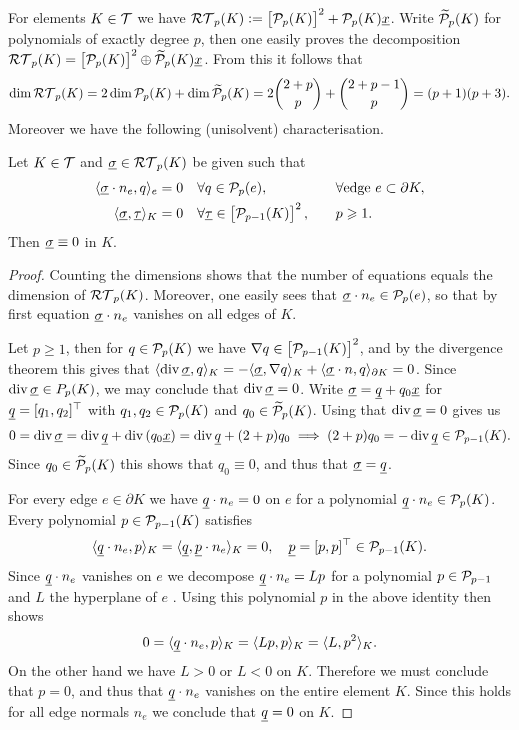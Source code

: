 \documentclass[thesis.tex]{subfiles}
\begin{document}
For elements $K \in  \T$ we have $\RT_p(K) := \left[ \P_p(K)\right]^2 + \P_p(K)\v{x}$.
Write $\wt \P_p(K)$ for polynomials of exactly degree $p$, then one easily proves the decomposition
$\RT_p(K) = \left [\P_p(K)\right]^2 \oplus \wt \P_p(K) \v{x}$.
From this it follows that 
\[
  \dim{\RT_p(K)} = 2 \dim{\P_p(K)}+ \dim{\wt \P_p(K)} = 2 {2 + p \choose p} + {2 + p - 1 \choose p} = (p+1)(p+3).
\]
Moreover we have the following (unisolvent) characterisation.
\begin{thm}
  Let $K \in  \T$ and $\vsig \in \RT_p(K)$ be given such that
  \begin{alignat*}{2}
    \ip{\vsig \cdot n_e, q}_e &= 0 \quad \forall q \in \P_p(e), &&\quad \forall \text{edge } e \subset \partial K,\\
    \ip{\vsig, \vtau}_K &= 0 \quad \forall \vtau \in \left[\P_{p-1}(K)\right]^2, &&\quad p \geq 1.
  \end{alignat*}
  Then $\vsig \equiv 0$ in $K$.
\end{thm}
\begin{proof}
  Counting the dimensions shows that the number of equations equals the dimension of $\RT_p(K)$. Moreover, one easily sees that $\vsig \cdot n_e \in \P_p(e)$, so that by first equation $\vsig \cdot n_e$ vanishes on all edges of $K$.

  Let $p \geq 1$, then for $q \in \P_p(K)$ we have $\nabla q \in \left[\P_{p-1}(K)\right]^2$, and by the divergence theorem this gives that
  $\ip{\div \vsig, q}_K = - \ip{\vsig, \nabla q}_K + \ip{\vsig \cdot n, q}_{\partial K} = 0$. Since $\div \vsig \in P_p(K)$, we
  may conclude that $\div \vsig = 0$.  Write $\vsig = \v{q} + q_0\v{x}$ for $\v{q} = [q_1, q_2]^\top$ with $q_1, q_2  \in\P_p(K)$ and $q_0 \in  \wt \P_p(K)$. Using that $\div \vsig =0$ gives us
  \[
    0 = \div \vsig = \div \v{q} + \div \left(q_0 \v{x}\right) = \div \v{q} + (2 + p) q_0 \implies (2 + p) q_0 = - \div \v{q} \in \P_{p-1}(K).
  \]
  Since $q_0 \in \wt \P_p(K)$ this shows that $q_0 \equiv 0$, and thus that $\vsig = \v{q}$.

  For every edge $e \in \partial K$ we have $\v{q} \cdot n_e =0$ on $e$ for a polynomial $\v{q} \cdot n_e \in \P_p(K)$. Every
  polynomial $p \in \P_{p-1}(K)$ satisfies
  \[
    \ip{\v{q} \cdot n_e, p}_K = \ip{\v{q}, \v{p} \cdot n_e}_K = 0, \quad \v{p} = [p,p]^\top \in \P_{p-1}(K).
  \]
  Since $\v{q}\cdot n_e$ vanishes on $e$ we decompose $\v{q}\cdot n_e = Lp$ for a polynomial $p \in \P_{p-1}$ and $L$ the hyperplane of $e$ \cite[Lem~3.1.10]{brenner}. Using this polynomial $p$ in the above identity then shows
  \[
    0 = \ip{\v{q}\cdot n_e, p}_K = \ip{Lp, p}_K = \ip{L,p^2}_K.
  \]
  On the other hand we have $L > 0$ or $L < 0$ on $K$. Therefore we must conclude that $p = 0$, and thus that $\v{q}\cdot n_e$ vanishes
  on the entire element $K$. Since this holds for all edge normals $n_e$ we conclude that $\v{q} = 0$ on $K$.
\end{proof}
\end{document}
